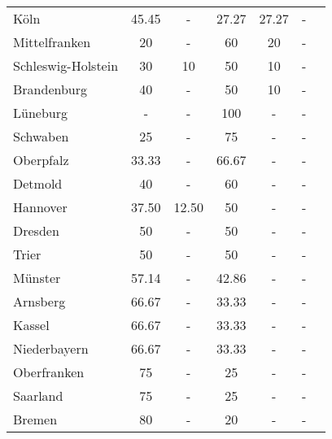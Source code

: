 \begin{table}[H]
\begin{tabularx}{\textwidth}{Xcccccc}
            Köln & 45.45 & - & 27.27 & 27.27 & - \\
            Mittelfranken & 20 & - & 60 & 20 & - \\
            Schleswig-Holstein & 30 & 10 & 50 & 10 & - \\
            Brandenburg & 40 & - & 50 & 10 & - \\
            Lüneburg & - & - & 100 & - & - \\
            Schwaben & 25 & - & 75 & - & - \\
            Oberpfalz & 33.33 & - & 66.67 & - & - \\
            Detmold & 40 & - & 60 & - & - \\
            Hannover & 37.50 & 12.50 & 50 & - & - \\
            Dresden & 50 & - & 50 & - & - \\
            Trier & 50 & - & 50 & - & - \\
            Münster & 57.14 & - & 42.86 & - & - \\
            Arnsberg & 66.67 & - & 33.33 & - & - \\
            Kassel & 66.67 & - & 33.33 & - & - \\
            Niederbayern & 66.67 & - & 33.33 & - & - \\
            Oberfranken & 75 & - & 25 & - & - \\
            Saarland & 75 & - & 25 & - & - \\
            Bremen & 80 & - & 20 & - & - \\
        \bottomrule
    \end{tabularx}
\end{table}
        